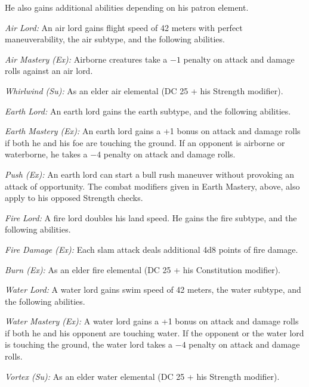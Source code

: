 {He also gains additional abilities depending on his patron element.

\textit{Air Lord:} An air lord gains flight speed of 42 meters with perfect maneuverability, the air subtype, and the following abilities.

\emph{Air Mastery (Ex):} Airborne creatures take a $-1$ penalty on attack and damage rolls against an air lord.

\emph{Whirlwind (Su):} As an elder air elemental (DC 25 + his Strength modifier).


\textit{Earth Lord:} An earth lord gains the earth subtype, and the following abilities.

\emph{Earth Mastery (Ex):} An earth lord gains a +1 bonus on attack and damage rolls if both he and his foe are touching the ground. If an opponent is airborne or waterborne, he takes a $-4$ penalty on attack and damage rolls.

\emph{Push (Ex):} An earth lord can start a bull rush maneuver without provoking an attack of opportunity. The combat modifiers given in Earth Mastery, above, also apply to his opposed Strength checks.


\textit{Fire Lord:} A fire lord doubles his land speed. He gains the fire subtype, and the following abilities.

\emph{Fire Damage (Ex):} Each slam attack deals additional 4d8 points of fire damage.

\emph{Burn (Ex):} As an elder fire elemental (DC 25 + his Constitution modifier).


\textit{Water Lord:} A water lord gains swim speed of 42 meters, the water subtype, and the following abilities.

\emph{Water Mastery (Ex):} A water lord gains a +1 bonus on attack and damage rolls if both he and his opponent are touching water. If the opponent or the water lord is touching the ground, the water lord takes a $-4$ penalty on attack and damage rolls.

\emph{Vortex (Su):} As an elder water elemental (DC 25 + his Strength modifier).

}
